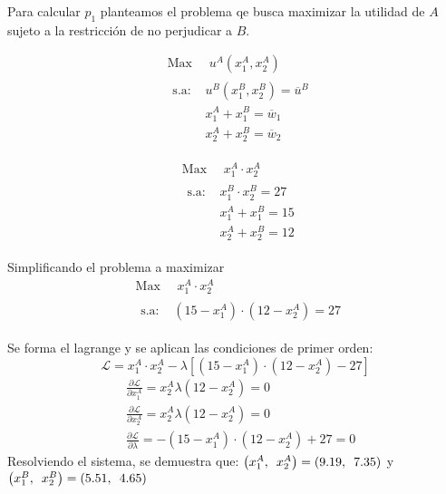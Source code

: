 Para calcular $p_1$ planteamos el problema qe busca maximizar la utilidad de $A$ sujeto a la restricción de no perjudicar a $B$.
		\vspace{-0.6cm}
	\setlength{\columnsep}{-5cm}
	\begin{multicols}{2}
		\begin{align*}
			& \text{Max } \quad u^{A}\left(x_{1}^{A},x_{2}^{A}\right) \\[0.1cm]
			& \begin{array}{ll}
				\text{s.a: } & u^{B}\left(x_{1}^{B},x_{2}^{B} \right) = \overline{u}^{B} \\[0.2cm]
				& x_{1}^{A}+x_{1}^{B} = \overline{w}_1 \\[0.2cm]
				& x_{2}^{A}+x_{2}^{B} = \overline{w}_2  
			\end{array}
		\end{align*}
	
		\begin{align*}
			& \text{Max } \quad x_{1}^{A} \cdot x_{2}^{A} \\[0.2cm]
			& \begin{array}{ll}
				\text{s.a: } & x_{1}^{B} \cdot x_{2}^{B}  = 27\\ [0.2cm]
				& x_{1}^{A}+x_{1}^{B} = 15  \\ [0.2cm]
				& x_{2}^{A}+x_{2}^{B} = 12  
			\end{array}
		\end{align*}
	\end{multicols}

Simplificando el problema a maximizar
	\begin{align*}
		& \text{Max } \quad x_{1}^{A} \cdot x_{2}^{A} \\[0.2cm]
		& \begin{array}{ll}
			\text{s.a: } & \left(15 - x_{1}^{A} \right)  \cdot \left( 12-  x_{2}^{A}\right)  = 27 
		\end{array}
	\end{align*}

Se forma el lagrange y se aplican las condiciones de primer orden:
	$$ \mathscr{L} =  x_{1}^{A} \cdot x_{2}^{A} - \lambda\left[\left(15 - x_{1}^{A} \right)  \cdot \left( 12-  x_{2}^{A}\right)  - 27 \right]$$
	\begin{align*}
		& \frac{\partial \mathscr{L}}{\partial x_{1}^{A}} = x_{2}^{A} \lambda \left(12 - x_{2}^{A} \right) = 0\\[0.3cm]
		& \frac{\partial \mathscr{L}}{\partial x_{2}^{A}} = x_{2}^{A} \lambda \left(12 - x_{2}^{A} \right) =0\\[0.3cm]
		& \frac{\partial \mathscr{L}}{\partial \lambda} = - \left(15 - x_{1}^{A} \right)  \cdot \left( 12-  x_{2}^{A}\right)  + 27 =0
	\end{align*}
Resolviendo el sistema, se demuestra que: $\left( x_{1}^{A},\enskip x_{2}^{A}\right) = \left(9.19, \enskip7.35 \right)$ y $\left( x_{1}^{B},\enskip x_{2}^{B}\right) = \left(5.51,\enskip 4.65 \right)$